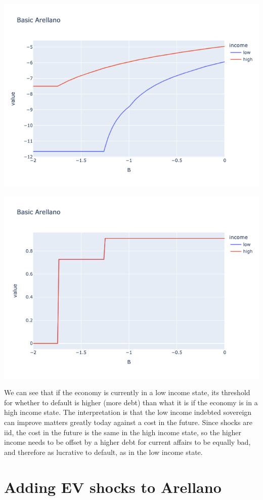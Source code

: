 \includegraphics[scale = 0.75]{figures/basic_arellano.png}

\includegraphics[scale = 0.75]{figures/basic_arellano_laffer.png}

We can see that if the economy is currently in a low income state, its threshold for whether to default is higher (more debt) than what it is if the economy is in a high income state. The interpretation is that the low income indebted sovereign can improve matters greatly today against a cost in the future. Since shocks are iid, the cost in the future is the same in the high income state, so the higher income needs to be offset by a higher debt for current affairs to be equally bad, and therefore as lucrative to default, as in the low income state. 

\section{Adding EV shocks to Arellano}

